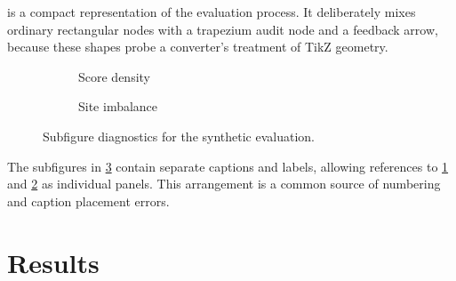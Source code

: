  is a compact representation of the evaluation process. It deliberately mixes ordinary rectangular nodes with a trapezium audit node and a feedback arrow, because these shapes probe a converter's treatment of TikZ geometry.

\begin{figure}[tbp]
\centering
\begin{subfigure}[t]{0.47\linewidth}
\centering
{}
\caption{Score density}
\label{fig:sub-density}
\end{subfigure}
\hfill
\begin{subfigure}[t]{0.47\linewidth}
\centering
{}
\caption{Site imbalance}
\label{fig:sub-imbalance}
\end{subfigure}
\caption{Subfigure diagnostics for the synthetic evaluation.}
\label{fig:subdiagnostics}
\end{figure}

The subfigures in \cref{fig:subdiagnostics} contain separate captions and labels, allowing references to \cref{fig:sub-density} and \cref{fig:sub-imbalance} as individual panels. This arrangement is a common source of numbering and caption placement errors.

\section{Results}

